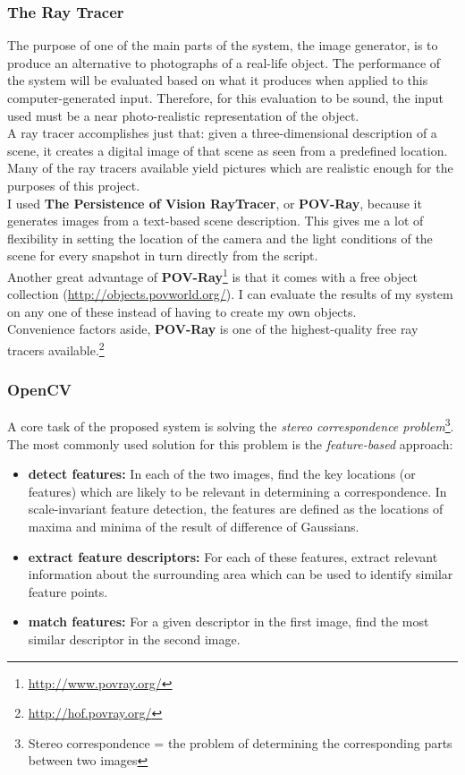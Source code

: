 \documentclass[12pt,a4paper,twoside,openright]{report}
\begin{document}
\subsubsection{The Ray Tracer} 
The purpose of one of the main parts of the system, the image generator, is to produce an alternative to photographs of a real-life object. The performance of the system will be evaluated based on what it produces when applied to this computer-generated input. Therefore, for this evaluation to be sound, the input used must be a near photo-realistic representation of the object.\\  
\linebreak
A ray tracer accomplishes just that: given a three-dimensional description of a scene, it creates a digital image of that scene as seen from a predefined location. Many of the ray tracers available yield pictures which are realistic enough for the purposes of this project. \\   
I used \textbf{The Persistence of Vision RayTracer}, or \textbf{POV-Ray}, because it generates images from a text-based scene description. This gives me a lot of flexibility in setting the location of the camera and the light conditions of the scene for every snapshot in turn directly from the script.\\
Another great advantage of \textbf{POV-Ray}\footnote{\url{http://www.povray.org/}} is that it comes with a free object collection (\url{http://objects.povworld.org/}). I can evaluate the results of my system on any one of these instead of having to create my own objects.\\
Convenience factors aside, \textbf{POV-Ray} is one of the highest-quality free ray tracers available.\footnote{\url{http://hof.povray.org/}}

\subsubsection{OpenCV}
A core task of the proposed system is solving the \emph{stereo correspondence problem}\footnote{Stereo correspondence = the problem of determining the corresponding parts between two images}. The most commonly used solution for this problem is the \emph{feature-based} approach:
\begin{itemize}
\item \textbf{detect features:} In each of the two images, find the key locations (or features) which are likely to be relevant in determining a correspondence. In scale-invariant feature detection, the features are defined as the locations of maxima and minima of the result of difference of Gaussians.   
\item \textbf{extract feature descriptors:} For each of these features, extract relevant information about the surrounding area which can be used to identify similar feature points.
\item \textbf{match features:} For a given descriptor in the first image, find the most similar descriptor in the second image.  
\end{itemize}
\end{document}
